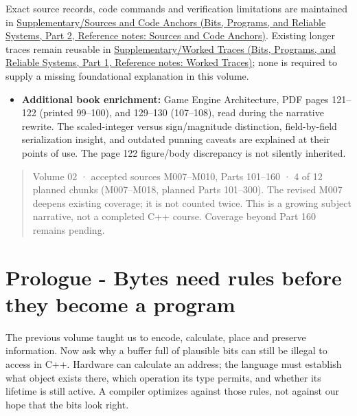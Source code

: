 Exact source records, code commands and verification limitations are maintained in \href{../01-Bits-Programs-and-Reliable-Systems-P02/main.pdf\#nameddest=appendix-a103e7846d21}{Supplementary/Sources and Code Anchors (Bits, Programs, and Reliable Systems, Part 2, Reference notes: Sources and Code Anchors)}. Existing longer traces remain reusable in \href{../01-Bits-Programs-and-Reliable-Systems-P01/main.pdf\#nameddest=appendix-92ff77d4dfdc}{Supplementary/Worked Traces (Bits, Programs, and Reliable Systems, Part 1, Reference notes: Worked Traces)}; none is required to supply a missing foundational explanation in this volume.

\begin{itemize}
\tightlist
\item
  \textbf{Additional book enrichment:} Game Engine Architecture, PDF pages 121--122 (printed 99--100), and 129--130 (107--108), read during the narrative rewrite. The scaled-integer versus sign/magnitude distinction, field-by-field serialization insight, and outdated punning caveats are explained at their points of use. The page 122 figure/body discrepancy is not silently inherited.
\end{itemize}

\begin{quote}
Volume 02 · accepted sources M007--M010, Parts 101--160 · 4 of 12 planned chunks (M007--M018, planned Parts 101--300). The revised M007 deepens existing coverage; it is not counted twice. This is a growing subject narrative, not a completed C++ course. Coverage beyond Part 160 remains pending.
\end{quote}

\section{Prologue - Bytes need rules before they become a program}\label{05-engine-i-ch002-prologue---bytes-need-rules-before-they-become-a-program}

\hypertarget{05-engine-i-ch002-prologue---bytes-need-rules-before-they-become-a-program}{}

The previous volume taught us to encode, calculate, place and preserve information. Now ask why a buffer full of plausible bits can still be illegal to access in C++. Hardware can calculate an address; the language must establish what object exists there, which operation its type permits, and whether its lifetime is still active. A compiler optimizes against those rules, not against our hope that the bits look right.

